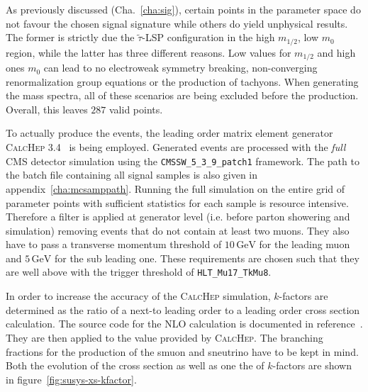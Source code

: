 As previously discussed (Cha.~\ref{cha:sig}), certain points in the parameter space do not favour the chosen signal signature while others do yield unphysical results. The former is strictly due the $\tilde{\tau}$-LSP configuration in the high $m_{1/2}$, low $m_0$ region, while the latter has three different reasons. Low values for $m_{1/2}$ and high ones $m_0$ can lead to no electroweak symmetry breaking, non-converging renormalization group equations or the production of tachyons. When generating the mass spectra, all of these scenarios are being excluded before the production. Overall, this leaves $287$ valid points.

To actually produce the events, the leading order matrix element generator \textsc{CalcHep 3.4}~\cite{calchep} is being employed. Generated events are processed with the \textit{full} CMS detector simulation using the \verb+CMSSW_5_3_9_patch1+ framework. The path to the batch file containing all signal samples is also given in appendix~\ref{cha:mcsamppath}. Running the full simulation on the entire grid of parameter points with sufficient statistics for each sample is resource intensive. Therefore a filter is applied at generator level (i.e. before parton showering and simulation) removing events that do not contain at least two muons. They also have to pass a transverse momentum threshold of $10\,\text{GeV}$ for the leading muon and $5\,\text{GeV}$ for the sub leading one. These requirements are chosen such that they are well above with the trigger threshold of \verb+HLT_Mu17_TkMu8+.

In order to increase the accuracy of the \textsc{CalcHep} simulation, $k$-factors are determined as the ratio of a next-to leading order to a leading order cross section calculation. The source code for the NLO calculation is documented in reference~\cite{susyxstool}. They are then applied to the value provided by \textsc{CalcHep}. The branching fractions for the production of the smuon and sneutrino have to be kept in mind. Both the evolution of the cross section as well as one the of $k$-factors are shown in figure~\ref{fig:susys-xs-kfactor}.

